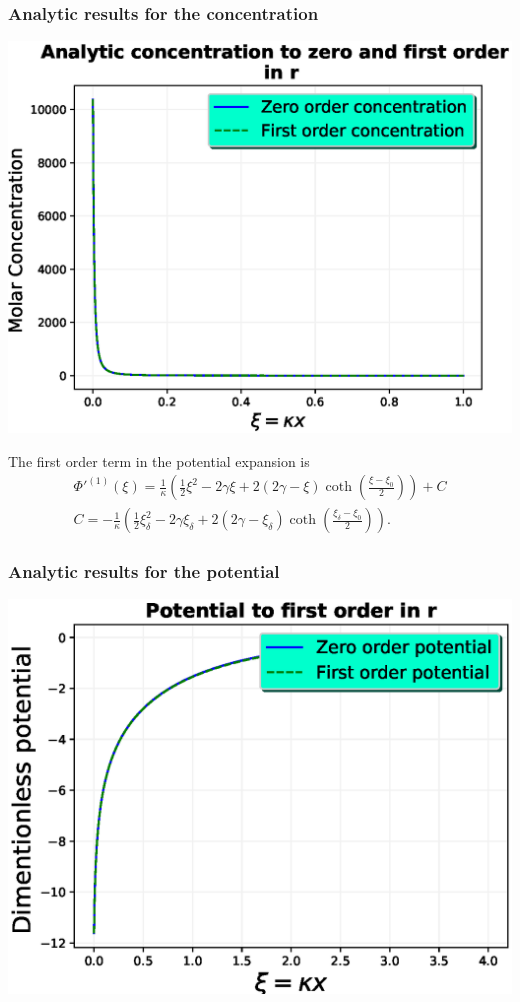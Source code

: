 \documentclass{beamer}
\newcommand{\qty}[1]
{
	\left({#1}\right)
}
\begin{document}
\begin{frame}
\frametitle{Analytic results for the concentration}
\includegraphics[width=\linewidth]{concentrations.eps}
\end{frame}

\begin{frame}
The first order term in the potential expansion is
\begin{align*}
\Phi'^{(1)}(\xi) = \frac{1}{\kappa} \qty{\frac{1}{2}\xi^2 -2\gamma \xi + 2(2\gamma-\xi)\coth\qty{\frac{\xi-\xi_0}{2}}} + C\\
C = -\frac{1}{\kappa} \qty{\frac{1}{2}\xi_\delta^2 -2\gamma \xi_\delta + 2(2\gamma-\xi_\delta)\coth\qty{\frac{\xi_\delta-\xi_0}{2}}}.
\end{align*}

\end{frame}

\begin{frame}
\frametitle{Analytic results for the potential}
\includegraphics[width=\linewidth]{potentials-ana.eps}
\end{frame}
\end{document}
